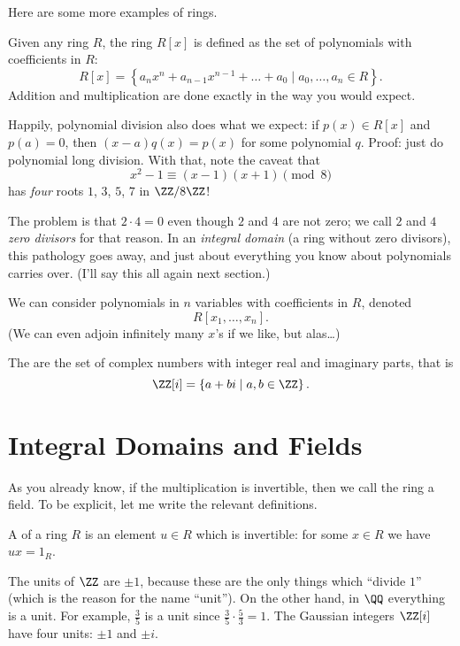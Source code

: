 Here are some more examples of rings.
\begin{example}
	Given any ring $R$, the ring $R[x]$ is defined as the set of polynomials
	with coefficients in $R$:
	\[ R[x] = \left\{ a_nx^n+a_{n-1}x^{n-1}+\dots+a_0 \mid a_0, \dots, a_n \in R \right\}. \]
	Addition and multiplication are done exactly in the way you would expect.
\end{example}
\begin{remark}
	[Digression] Happily, polynomial division also does what we expect: if $p(x) \in R[x]$
	and $p(a) = 0$, then $(x-a)q(x) = p(x)$ for some polynomial $q$.
	Proof: just do polynomial long division.
	With that, note the caveat that 
	\[ x^2-1 \equiv (x-1)(x+1) \pmod 8 \] has \emph{four} roots $1$, $3$, $5$, $7$ in
	$\ZZ/8\ZZ$!

	The problem is that $2 \cdot 4 = 0$ even though $2$ and $4$ are not zero;
	we call $2$ and $4$ \emph{zero divisors} for that reason.
	In an \emph{integral domain} (a ring without zero divisors), this pathology goes away,
	and just about everything you know about polynomials carries over.
	(I'll say this all again next section.)
\end{remark}
\begin{example}
	We can consider polynomials in $n$ variables with coefficients in $R$,
	denoted \[ R[x_1, \dots, x_n]. \]
	(We can even adjoin infinitely many $x$'s if we like, but alas\dots)
\end{example}
\begin{example}
	The  are the set of complex numbers
	with integer real and imaginary parts, that is
	\[ \ZZ[i] = \left\{ a+bi \mid a,b \in \ZZ \right\}. \]
\end{example}

\section{Integral Domains and Fields}

As you already know, if the multiplication is invertible,
then we call the ring a field.
To be explicit, let me write the relevant definitions.

\begin{definition}
	A  of a ring $R$
	is an element $u \in R$ which is invertible:
	for some $x \in R$ we have $ux = 1_R$.
\end{definition}
\begin{example}
	\listhack
	\begin{enumerate}[(a)]
	\ii The units of $\ZZ$ are $\pm 1$,
	because these are the only things which ``divide $1$''
	(which is the reason for the name ``unit'').
	\ii On the other hand, in $\QQ$ everything is a unit.
	For example, $\frac 35$ is a unit since $\frac 35 \cdot \frac 53 = 1$.
	\ii The Gaussian integers $\ZZ[i]$ have four units: $\pm 1$ and $\pm i$.
	\end{enumerate}
\end{example}

